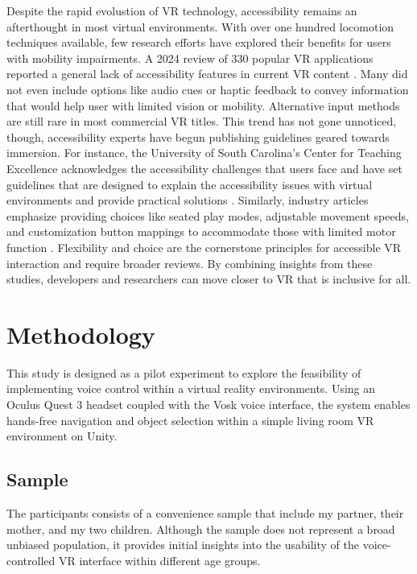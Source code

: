 \documentclass[manuscript, screen, review]{acmart}
\begin{document}
Despite the rapid evolustion of VR technology, accessibility remains an afterthought in most virtual environments. With over one hundred locomotion techniques available, few research efforts have explored their benefits for users with mobility impairments\cite{a4}. A 2024 review of 330 popular VR applications reported a general lack of accessibility features in current VR content \cite{a5}. Many did not even include options like audio cues or haptic feedback to convey information that would help user with limited vision or mobility.  Alternative input methods are still rare in most commercial VR titles\cite{a5}. This trend has not gone unnoticed, though, accessibility experts have begun publishing guidelines geared towards immersion. For instance, the University of South Carolina's Center for Teaching Excellence acknowledges the accessibility challenges that users face and have set guidelines that are designed to explain the accessibility issues with virtual environments and provide practical solutions \cite{b1}. Similarly, industry articles emphasize providing choices like seated play modes, adjustable movement speeds, and customization button mappings to accommodate those with limited motor function \cite{a6}. Flexibility and choice are the cornerstone principles for accessible VR interaction and require broader reviews. By combining insights from these studies, developers and researchers can move closer to VR that is inclusive for all.

 \section{Methodology}
This study is designed as a pilot experiment to explore the feasibility of implementing voice control within a virtual reality environments. Using an Oculus Quest 3 headset coupled with the Vosk voice interface, the system enables hands-free navigation and object selection within a simple living room VR environment on Unity. 
 
 \subsection{Sample}
The participants consists of a convenience sample that include my partner, their mother, and my two children. Although the sample does not represent a broad unbiased population, it provides initial insights into the usability of the voice-controlled VR interface within different age groups.  

\end{document}

